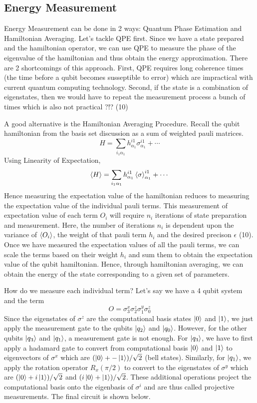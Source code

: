 \documentclass{article}
\begin{document}
  \subsection{Energy Measurement}
    Energy Measurement can be done in 2 ways: Quantum Phase Estimation and
    Hamiltonian Averaging. Let's tackle QPE first. Since we have a state
    prepared and the hamiltonian operator, we can use QPE to measure the
    phase of the eigenvalue of the hamiltonian and thus obtain the energy
    approximation. There are 2 shortcomings of this approach. First, QPE
    requires long coherence times (the time before a qubit becomes susseptible
    to error) which are impractical with current quantum computing technology.
    Second, if the state is a combination of eigenstates, then we would have
    to repeat the measurement process a bunch of times which is also not
    practical ?!? (10)

    A good alternative is the Hamiltonian Averaging Procedure. Recall the qubit
    hamiltonian from the basis set discussion as a sum of weighted pauli
    matrices.
    \[H = \sum_{i_1\alpha_1} h^{i1}_{\alpha_1}\sigma^{i1}_{\alpha_1} + \cdots\]
    Using Linearity of Expectation,
    \[\expval{H} = \sum_{i_1\alpha_1} h^{i1}_{\alpha_1}\expval{\sigma}^{i1}_{\alpha_1} + \cdots\]
    Hence measuring the expectation value of the hamiltonian reduces to measuring
    the expectation value of the individual pauli terms. This measurement of
    expectation value of each term \(O_i\) will require \(n_i\) iterations of
    state preparation and measurement. Here, the number of iterations \(n_i\)
    is dependent upon the variance of \(\expval{O_i}\), the weight of that
    pauli term \(h_i\) and the desired precison \(\epsilon\) (10). Once we have
    measured the expectation values of all the pauli terms, we can scale
    the terms based on their weight \(h_i\) and sum them to obtain the
    expectation value of the qubit hamiltonian. Hence, through hamiltonian
    averaging, we can obtain the energy of the state corresponding to a
    given set of parameters.

    How do we measure each individual term? Let's say we have a 4 qubit
    system and the term
    \[O = \sigma^{x}_3\sigma^{z}_2\sigma^{y}_1\sigma^{z}_0\]
    Since the eigenstates of \(\sigma^{z}\) are the computational basis states
    \(\ket{0}\) and \(\ket{1}\), we just apply the measurement gate to the
    qubits \(\ket{q_2}\) and \(\ket{q_0}\). However, for the other qubits
    \(\ket{q_3}\) and \(\ket{q_1}\), a measurement gate is not enough. For
    \(\ket{q_3}\), we have to first apply a hadamard gate to convert
    from computational basis \(\ket{0}\) and \(\ket{1}\) to eigenvectors
    of \(\sigma^{x}\) which are \((\ket{0} +- \ket{1})/\sqrt2\) (bell states).
    Similarly, for \(\ket{q_1}\), we apply the rotation operator
    \(R_x (\pi/2)\) to convert to the eigenstates of \(\sigma^{y}\) which
    are \((\ket{0} + i\ket{1})/\sqrt2\) and
    \((i\ket{0} + \ket{1})/\sqrt2\). These additional operations project
    the computational basis onto the eigenbasis of \(\sigma^{i}\) and are
    thus called projective measurements. The final circuit is shown below.
\end{document}

